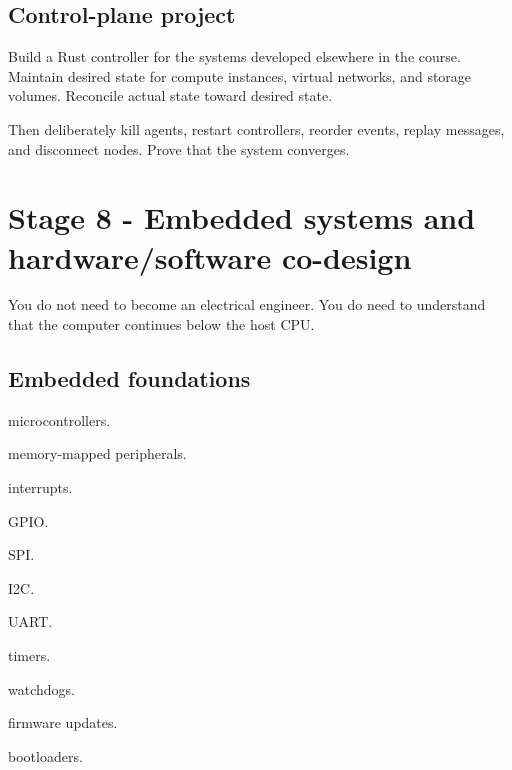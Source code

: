 \documentclass[11pt,letterpaper]{article}
\begin{document}
\subsection*{Control-plane project}

Build a Rust controller for the systems developed elsewhere in the course. Maintain desired state for compute instances, virtual networks, and storage volumes. Reconcile actual state toward desired state.

Then deliberately kill agents, restart controllers, reorder events, replay messages, and disconnect nodes. Prove that the system converges.

\section{Stage 8 - Embedded systems and hardware/software co-design}\label{sec:12}

\label{stage:8}

You do not need to become an electrical engineer. You do need to understand that the computer continues below the host CPU.

\subsection*{Embedded foundations}

\begin{topics}

\item microcontrollers.

\item memory-mapped peripherals.

\item interrupts.

\item GPIO.

\item SPI.

\item I2C.

\item UART.

\item timers.

\item watchdogs.

\item firmware updates.

\item bootloaders.

\end{topics}
\end{document}
